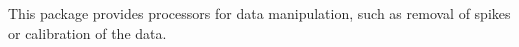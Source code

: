 
This package provides processors for data manipulation, such as
removal of spikes or calibration of the data.
